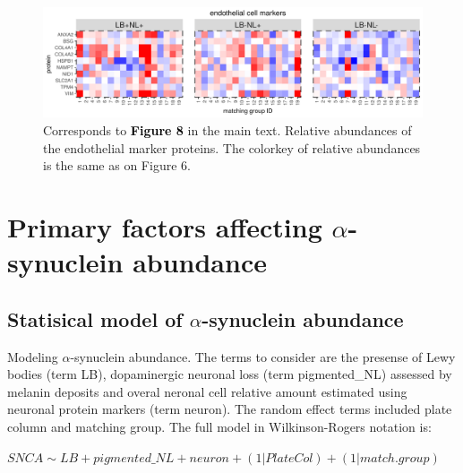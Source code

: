 \documentclass[11pt]{article}\usepackage[]{graphicx}\usepackage[usenames,dvipsnames]{color}
\newenvironment{knitrout}{}{} %
\begin{document}
\begin{figure}[h!]
\center
\begin{minipage}{1.0\textwidth}
\begin{knitrout}
\color{fgcolor}

{\centering \includegraphics[width=1\textwidth]{figure/endothelial_heatmap-1} 

}



\end{knitrout}
\caption{Corresponds to
\textcolor{black}{\colorbox{highlighter}{\textbf{Figure 8}}} in the main text.
Relative abundances of the endothelial marker proteins. 
The colorkey of relative abundances is the same as on Figure 6.}
\label{fig:EndothelialHeatmaps}
\end{minipage}
\end{figure}

\clearpage





\section{Primary factors affecting $\alpha$-synuclein abundance}

\subsection{Statisical model of $\alpha$-synuclein abundance}

Modeling $\alpha$-synuclein abundance. The terms to consider are the presense of
Lewy bodies (term LB), dopaminergic neuronal loss (term pigmented\_NL) assessed by melanin
deposits and overal neronal cell relative amount estimated using neuronal 
protein markers (term neuron). The random effect terms included plate column and 
matching group. The full model in Wilkinson-Rogers notation is:
\begin{center}
$SNCA \sim LB + pigmented\_NL + neuron + (1|PlateCol) + (1|match.group)$
\end{center}
\end{document}
